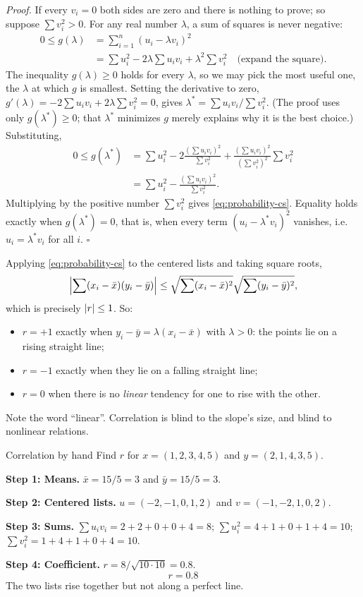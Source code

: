 \emph{Proof.} If every $v_i=0$ both sides are zero and there is nothing to prove; so suppose $\sum v_i^2>0$. For any real number $\lambda$, a sum of squares is never negative:
\begin{align*}
0 \le g(\lambda) &= \sum_{i=1}^n (u_i-\lambda v_i)^2\\
&= \sum u_i^2 - 2\lambda\sum u_iv_i + \lambda^2\sum v_i^2 \quad\text{(expand the square)}.
\end{align*}
The inequality $g(\lambda)\ge0$ holds for every $\lambda$, so we may pick the most useful one, the $\lambda$ at which $g$ is smallest. Setting the derivative to zero, $g'(\lambda)=-2\sum u_iv_i+2\lambda\sum v_i^2=0$, gives $\lambda^*=\sum u_iv_i\big/\sum v_i^2$. (The proof uses only $g(\lambda^*)\ge0$; that $\lambda^*$ minimizes $g$ merely explains why it is the best choice.) Substituting,
\begin{align*}
0\le g(\lambda^*) &= \sum u_i^2 - 2\frac{(\sum u_iv_i)^2}{\sum v_i^2}+\frac{(\sum u_iv_i)^2}{(\sum v_i^2)^2}\sum v_i^2\\
&= \sum u_i^2 - \frac{(\sum u_iv_i)^2}{\sum v_i^2}.
\end{align*}
Multiplying by the positive number $\sum v_i^2$ gives \cref{eq:probability-cs}. Equality holds exactly when $g(\lambda^*)=0$, that is, when every term $(u_i-\lambda^*v_i)^2$ vanishes, i.e. $u_i=\lambda^*v_i$ for all $i$. \hfill$\square$

Applying \cref{eq:probability-cs} to the centered lists and taking square roots,
\[
\Bigl|\sum(x_i-\bar x)(y_i-\bar y)\Bigr| \le \sqrt{\sum(x_i-\bar x)^2}\sqrt{\sum(y_i-\bar y)^2},
\]
which is precisely $\left\lvert r\right\rvert\le1$. So:
\begin{itemize}
\item $r=+1$ exactly when $y_i-\bar y=\lambda(x_i-\bar x)$ with $\lambda>0$: the points lie on a rising straight line;
\item $r=-1$ exactly when they lie on a falling straight line;
\item $r=0$ when there is no \emph{linear} tendency for one to rise with the other.
\end{itemize}
Note the word ``linear''. Correlation is blind to the slope's size, and blind to nonlinear relations.

\begin{sample}{Correlation by hand}
Find $r$ for $x=(1,2,3,4,5)$ and $y=(2,1,4,3,5)$.

\textbf{Step 1: Means.} $\bar x=15/5=3$ and $\bar y=15/5=3$.

\textbf{Step 2: Centered lists.} $u=(-2,-1,0,1,2)$ and $v=(-1,-2,1,0,2)$.

\textbf{Step 3: Sums.} $\sum u_iv_i = 2+2+0+0+4=8$; $\sum u_i^2=4+1+0+1+4=10$; $\sum v_i^2=1+4+1+0+4=10$.

\textbf{Step 4: Coefficient.} $r=8/\sqrt{10\cdot10}=0.8$.
\[
\boxed{r=0.8}
\]
The two lists rise together but not along a perfect line.
\end{sample}

